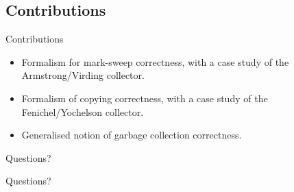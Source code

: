 \documentclass[usenames,dvipsnames]{beamer}
\begin{document}
\subsection{Contributions}

\begin{frame}{Contributions}
  \begin{itemize}
  \item Formalism for mark-sweep correctness, with a case study of the
    Armstrong/Virding collector.
  \item Formalism of copying correctness, with a case study of the
    Fenichel/Yochelson collector.
  \item Generalised notion of garbage collection correctness.
  \end{itemize}

\end{frame}


\begin{frame}{Questions?}
  \begin{center}
    \huge Questions?
  \end{center}

  
  \nocite{Myreen10,McCreight07}
  \footnotesize
  

\end{frame}

\end{document}

